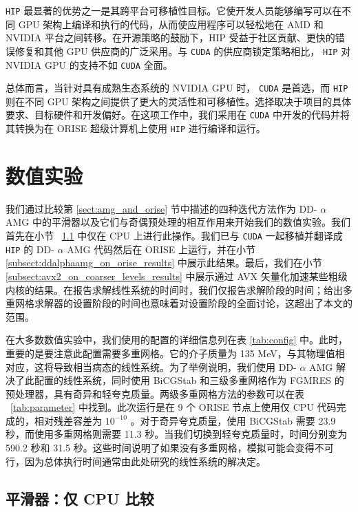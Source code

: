 \documentclass[5p,times,a4paper,fleqn]{cas-dc}
\begin{document}
   \texttt{HIP}    最显著的优势之一是其跨平台可移植性目标。它使开发人员能够编写可以在不同 GPU 架构上编译和执行的代码，从而使应用程序可以轻松地在 AMD 和 NVIDIA 平台之间转移。在开源策略的鼓励下，HIP 受益于社区贡献、更快的错误修复和其他 GPU 供应商的广泛采用。与    \texttt{CUDA}    的供应商锁定策略相比，   \texttt{HIP}    对 NVIDIA GPU 的支持不如    \texttt{CUDA}    全面。  

总体而言，当针对具有成熟生态系统的 NVIDIA GPU 时，   \texttt{CUDA}    是首选，而    \texttt{HIP}    则在不同 GPU 架构之间提供了更大的灵活性和可移植性。选择取决于项目的具体要求、目标硬件和开发偏好。在这项工作中，我们采用在    \texttt{CUDA}    中开发的代码并将其转换为在 ORISE 超级计算机上使用    \texttt{HIP}    进行编译和运行。  

   \section{数值实验  }       \label{sect:num_exps}     

我们通过比较第    \ref{sect:amg_and_orise}    节中描述的四种迭代方法作为 DD-   $\alpha$    AMG 中的平滑器以及它们与奇偶预处理的相互作用来开始我们的数值实验。我们首先在小节 \     \ref{subsect:smoothers_comp_cpu_only}    中仅在 CPU 上进行此操作。我们已与    \texttt{CUDA}    一起移植并翻译成    \texttt{HIP}    的 DD-   $\alpha$    AMG 代码然后在 ORISE 上运行，并在小节    \ref{subsect:ddalphaamg_on_orise_results}    中展示此结果。最后，我们在小节    \ref{subsect:avx2_on_coarser_levels_results}    中展示通过 AVX 矢量化加速某些粗级内核的结果。在报告求解线性系统的时间时，我们仅报告求解阶段的时间；给出多重网格求解器的设置阶段的时间也意味着对设置阶段的全面讨论，这超出了本文的范围。  

在大多数数值实验中，我们使用的配置的详细信息列在表    \ref{tab:config}    中。此时，重要的是要注意此配置需要多重网格。它的介子质量为 135 MeV，与其物理值相对应，这将导致相当病态的线性系统。为了举例说明，我们使用 DD-    $\alpha$    AMG 解决了此配置的线性系统，同时使用 BiCGStab 和三级多重网格作为 FGMRES    \cite{rottmann2016adaptive}    的预处理器，具有奇异和轻夸克质量。两级多重网格方法的参数可以在表 \     \ref{tab:parameter}    中找到。此次运行是在 9 个 ORISE 节点上使用仅 CPU 代码完成的，相对残差容差为    $10^{-10}$   。对于奇异夸克质量，使用 BiCGStab 需要 23.9 秒，而使用多重网格则需要 11.3 秒。当我们切换到轻夸克质量时，时间分别变为 590.2 秒和 31.5 秒。这些时间说明了如果没有多重网格，模拟可能会变得不可行，因为总体执行时间通常由此处研究的线性系统的解决定。  

   \subsection{平滑器：仅 CPU 比较  }       \label{subsect:smoothers_comp_cpu_only}     
\end{document}

